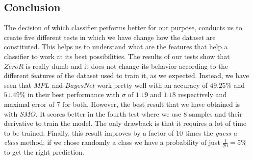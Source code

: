 \documentclass[12pt]{article}
\begin{document}
\subsection{Conclusion} 
The decision of which classifier performs better for our purpose, conducts us to create five different tests in which we have change how the dataset are constituted.
This helps us to understand what are the features that help a classifier to work at its best possibilities.
The results of our tests show that $ZeroR$ is really dumb and it does not change its behavior according to the different features of the dataset used to train it, as we expected.
Instead, we have seen that $MPL$ and $BayesNet$ work pretty well with an accuracy of $49.25\%$ and $51.49\%$ in their best performance with $\sigma$ of $1.19$ and $1.18$ respectively and maximal error of $7$ for both.
However, the best result that we have obtained is with $SMO$. 
It scores better in the fourth test where we use $8$ samples and their derivative to train the model. 
The only drawback is that it requires a lot of time to be trained.
Finally, this result improves by a factor of 10 times the \textit{guess a class} method; if we chose randomly a class we have a probability of just $\frac{1}{20} = 5\%$ to get the right prediction.


\printbibliography 

	
\end{document}

